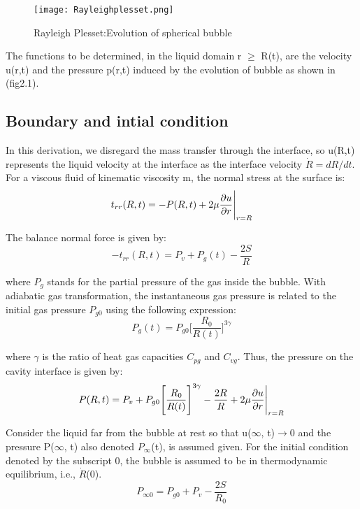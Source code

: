 \begin{figure}[H]
 \centering
 \texttt{[image: Rayleighplesset.png]}
 \caption{Rayleigh Plesset:Evolution of spherical bubble \cite{FundamentalsofCavitation.2004}}
  \label{fig:fig13}
\end{figure}

The functions to be determined, in the liquid domain r $\ge$ R(t), are
the velocity u(r,t) and the pressure p(r,t) induced by the evolution
of bubble as shown in (fig2.1).
\subsection{Boundary and intial condition}
In this derivation, we disregard the mass transfer through the
interface, so u(R,t) represents the liquid velocity at the interface
as the interface velocity $\dot R=$${dR}/{dt}$.  For a viscous fluid
of kinematic viscosity m, the normal stress at the surface is:
\begin{equation}
{t_{rr}}(R,t)=-P(R,t)+2{\mu}{\frac{\partial{u}}{\partial{r}}}\Bigg{\vert}_{r=R}
\end{equation}

The balance normal force is given by:
\begin{equation}
-{t_{rr}}(R,t)=P_{v}+{P_{g}}(t)-{\frac{2S}{R}}
\end{equation}

where $P_g$ stands for the partial pressure of the gas inside the
bubble. With adiabatic gas transformation, the instantaneous gas
pressure is related to the initial gas pressure $P_{g0}$ using the
following expression:
\begin{equation}
{P_{g}}(t)=P_{g0}\Bigg[\frac{R_0}{R(t)}\Bigg]^{3\gamma}
\end{equation}

where $\gamma$ is the ratio of heat gas capacities $C_{pg}$ and
$C_{vg}$.  Thus, the pressure on the cavity interface is given by:
\begin{equation}
P(R,t)=P_{v}+P_{g0}\Bigg[{\frac{R_0}{R(t)}}\Bigg]^{3\gamma}-{\frac{2R}{R}}+2\mu{\frac{\partial{u}}{\partial{r}}}\Bigg{\vert}_{r=R}
\end{equation}

Consider the liquid far from the bubble at rest so that
u($\infty$, t)$\rightarrow$0 and the pressure P($\infty$, t) also
denoted $P_{\infty}$(t), is assumed given.  For the initial condition
denoted by the subscript 0, the bubble is assumed to be in
thermodynamic equilibrium, i.e., $\dot{R}$(0).
\begin{equation}
P_{{\infty}{0}} =P_{g0}+P_v-\frac{2S}{R_0}
\end{equation}

